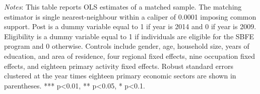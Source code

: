 \begin{landscape}
\begin{table}[H]
\begin{adjustbox}{width=\linewidth}
\begin{threeparttable}
			\begin{tablenotes}
				\setlength{}
				\footnotesize
				\item \textit{Notes}: This table reports OLS estimates of a matched sample. The matching estimator is single nearest-neighbour within a caliper of 0.0001 imposing common support. Post is a dummy variable equal to 1 if year is 2014 and 0 if year is 2009. Eligibility is a dummy variable equal to 1 if individuals are eligible for the SBFE program and 0 otherwise. Controls include gender, age, household size, years of education, and area of residence, four regional fixed effects, nine occupation fixed effects, and eighteen primary activity fixed effects. Robust standard errors clustered at the year times eighteen primary economic sectors are shown in parentheses. *** p<0.01, ** p<0.05, * p<0.1.
			\end{tablenotes}
		\end{threeparttable}
	\end{adjustbox}
\end{table}



\newpage 


\end{landscape}
